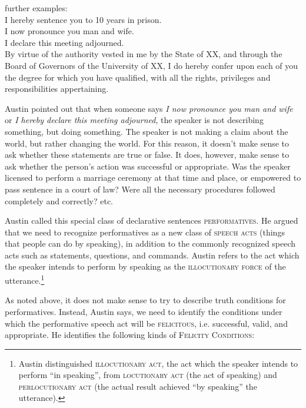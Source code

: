 \ea
further examples:\\
\ea I hereby sentence you to 10 years in prison.\\
\ex I now pronounce you man and wife.\\
\ex I declare this meeting adjourned.\\
\ex By virtue of the authority vested in me by the State of XX, and through the Board of Governors of the University of XX, I do hereby confer upon each of you the degree for which you have qualified, with all the rights, privileges and responsibilities appertaining.
                       \z
\z


Austin pointed out that when someone says \textit{I now pronounce you man and wife} or \textit{I hereby declare this meeting adjourned}, the speaker is not describing something, but doing something. The speaker is not making a claim about the world, but rather changing the world. For this reason, it doesn’t make sense to ask whether these statements are true or false. It does, however, make sense to ask whether the person’s action was successful or appropriate. Was the speaker licensed to perform a marriage ceremony at that time and place, or empowered to pass sentence in a court of law? Were all the necessary procedures followed completely and correctly? etc.



Austin called this special class of declarative sentences \textsc{performatives}. He argued that we need to recognize performatives as a new class of \textsc{speech acts} (things that people can do by speaking), in addition to the commonly recognized speech acts such as statements, questions, and commands. Austin refers to the act which the speaker intends to perform by speaking as the \textsc{illocutionary force} of the utterance.\footnote{Austin distinguished \textsc{illocutionary act,} the act which the speaker intends to perform “in speaking”, from \textsc{locutionary act} (the act of speaking) and \textsc{perlocutionary act} (the actual result achieved “by speaking” the utterance).}



As noted above, it does not make sense to try to describe truth conditions for performatives. Instead, Austin says, we need to identify the conditions under which the performative speech act will be \textsc{felicitous}, i.e. successful, valid, and appropriate. He identifies the following kinds of \textsc{Felicity Conditions}:


\ea






